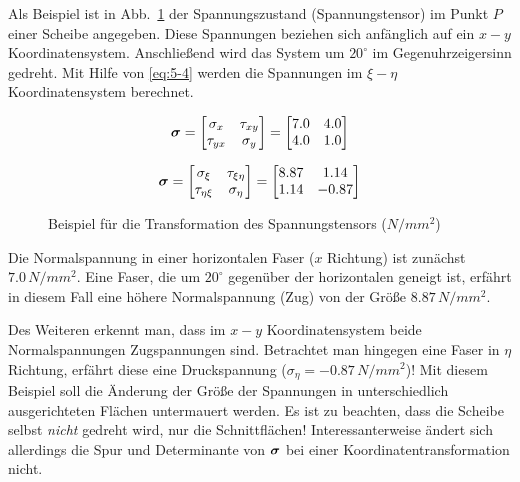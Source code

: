 Als Beispiel ist in Abb.~\ref{fig:5-5} der Spannungszustand (Spannungstensor) im Punkt $P$ einer Scheibe angegeben.
Diese Spannungen beziehen sich anfänglich auf ein $x - y$ Koordinatensystem.
Anschließend wird das System um $20^\circ$ im Gegenuhrzeigersinn gedreht. 
Mit Hilfe von \eqref{eq:5-4} werden die Spannungen im $\xi - \eta$ Koordinatensystem berechnet.
%
\begin{figure}[h!]
	\begin{minipage}{\textwidth}
		\begin{center}
			
		\end{center} 
	\end{minipage}
	\newline
	\begin{center}
	\begin{minipage}{0.35\textwidth}
		\[
		\boldsymbol{\sigma} =
		\begin{bmatrix}
		\sigma_x & \tau_{xy} \\ \tau_{yx}  & \sigma_y
		\end{bmatrix} = 
		\begin{bmatrix}
		7.0 & 4.0 \\ 4.0 & 1.0
		\end{bmatrix}
		\]
	\end{minipage}
	\begin{minipage}{0.4\textwidth}
		\[
		\boldsymbol{\sigma} = 
		\begin{bmatrix}
		\sigma_\xi & \tau_{\xi\eta} \\ \tau_{\eta\xi}  & \sigma_\eta
		\end{bmatrix} = 
		\begin{bmatrix}
		8.87 & 1.14 \\ 1.14 & -0.87
		\end{bmatrix}
		\]
	\end{minipage}
	\end{center}
	\caption{Beispiel für die Transformation des Spannungstensors ($\unit{N/mm^2}$)}
	\label{fig:5-5}
\end{figure}
%
Die Normalspannung in einer horizontalen Faser ($x$ Richtung) ist zunächst $7.0\,\unit{N/mm^2}$.
Eine Faser, die um $20^\circ$ gegenüber der horizontalen geneigt ist, erfährt in diesem Fall eine höhere Normalspannung (Zug) von der Größe $8.87\,\unit{N/mm^2}$. 

Des Weiteren erkennt man, dass im $x - y$ Koordinatensystem beide Normalspannungen Zugspannungen sind.
Betrachtet man hingegen eine Faser in $\eta$ Richtung, erfährt diese eine Druckspannung ($\sigma_\eta=-0.87\,\unit{N/mm^2}$)!
Mit diesem Beispiel soll die Änderung der Größe der Spannungen in unterschiedlich ausgerichteten Flächen untermauert werden.
Es ist zu beachten, dass die Scheibe selbst \emph{nicht} gedreht wird, nur die Schnittflächen!
Interessanterweise ändert sich allerdings die Spur und Determinante von $\boldsymbol{\sigma}$ bei einer Koordinatentransformation nicht.

